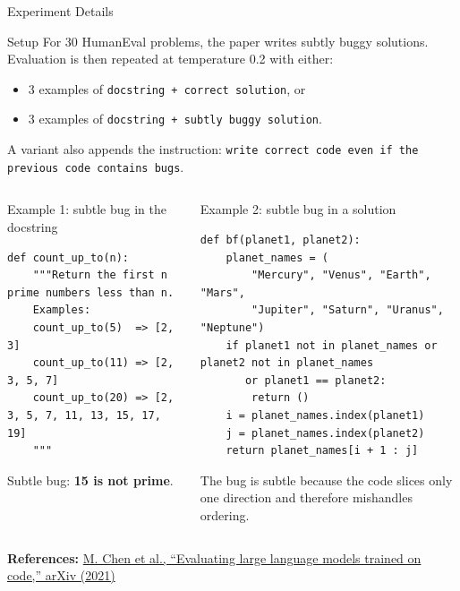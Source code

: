 \documentclass[aspectratio=43,9pt]{beamer}
\newcommand{\srclink}[2]{\href{#2}{\textcolor{black!68}{#1}}}
\newcommand{\refline}[2][References]{%
  \vfill
  {\raggedright\fontsize{5.1}{5.5}\selectfont\color{black!68}\textbf{#1:} #2\par}%
}
\newcommand{\srcChen}{\srclink{M. Chen et al., ``Evaluating large language models trained on code,'' arXiv (2021)}{https://arxiv.org/abs/2107.03374}}
\begin{document}
\begin{frame}[fragile]{Experiment Details}
\tiny
\begin{block}{Setup}
For 30 HumanEval problems, the paper writes subtly buggy solutions. Evaluation is then repeated at temperature 0.2 with either:
\begin{itemize}
  \item 3 examples of \texttt{docstring + correct solution}, or
  \item 3 examples of \texttt{docstring + subtly buggy solution}.
\end{itemize}
A variant also appends the instruction: \texttt{write correct code even if the previous code contains bugs}.
\end{block}

\begin{columns}[T,totalwidth=\textwidth]
\begin{block}{Example 1: subtle bug in the docstring}
\begin{lstlisting}
def count_up_to(n):
    """Return the first n prime numbers less than n.
    Examples:
    count_up_to(5)  => [2, 3]
    count_up_to(11) => [2, 3, 5, 7]
    count_up_to(20) => [2, 3, 5, 7, 11, 13, 15, 17, 19]
    """
\end{lstlisting}
Subtle bug: \textbf{15 is not prime}.
\end{block}

\begin{block}{Example 2: subtle bug in a solution}
\begin{lstlisting}
def bf(planet1, planet2):
    planet_names = (
        "Mercury", "Venus", "Earth", "Mars",
        "Jupiter", "Saturn", "Uranus", "Neptune")
    if planet1 not in planet_names or planet2 not in planet_names
       or planet1 == planet2:
        return ()
    i = planet_names.index(planet1)
    j = planet_names.index(planet2)
    return planet_names[i + 1 : j]
\end{lstlisting}
The bug is subtle because the code slices only one direction and therefore mishandles ordering.
\end{block}
\end{columns}

\refline{\srcChen}
\end{frame}
\end{document}
